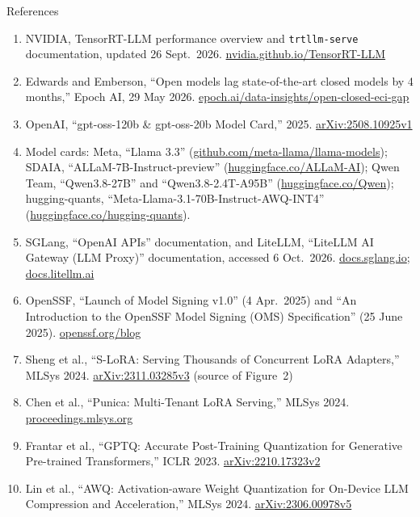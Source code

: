 \begin{frame}[allowframebreaks]{References}
\begin{enumerate}
    \item NVIDIA, TensorRT-LLM performance overview and \texttt{trtllm-serve} documentation, updated 26 Sept.\ 2026. \href{https://nvidia.github.io/TensorRT-LLM/developer-guide/perf-overview.html}{nvidia.github.io/TensorRT-LLM}
    \item Edwards and Emberson, ``Open models lag state-of-the-art closed models by 4 months,'' Epoch AI, 29 May 2026. \href{https://epoch.ai/data-insights/open-closed-eci-gap}{epoch.ai/data-insights/open-closed-eci-gap}
    \item OpenAI, ``gpt-oss-120b \& gpt-oss-20b Model Card,'' 2025. \href{https://arxiv.org/abs/2508.10925v1}{arXiv:2508.10925v1}
    \item Model cards: Meta, ``Llama 3.3'' (\href{https://github.com/meta-llama/llama-models/blob/main/models/llama3_3/MODEL_CARD.md}{github.com/meta-llama/llama-models}); SDAIA, ``ALLaM-7B-Instruct-preview'' (\href{https://huggingface.co/ALLaM-AI/ALLaM-7B-Instruct-preview}{huggingface.co/ALLaM-AI}); Qwen Team, ``Qwen3.8-27B'' and ``Qwen3.8-2.4T-A95B'' (\href{https://huggingface.co/Qwen/Qwen3.8-27B}{huggingface.co/Qwen}); hugging-quants, ``Meta-Llama-3.1-70B-Instruct-AWQ-INT4'' (\href{https://huggingface.co/hugging-quants/Meta-Llama-3.1-70B-Instruct-AWQ-INT4}{huggingface.co/hugging-quants}).
    \item SGLang, ``OpenAI APIs'' documentation, and LiteLLM, ``LiteLLM AI Gateway (LLM Proxy)'' documentation, accessed 6 Oct.\ 2026. \href{https://docs.sglang.io/basic_usage/openai_api_completions.html}{docs.sglang.io}; \href{https://docs.litellm.ai/docs/simple_proxy}{docs.litellm.ai}
    \item OpenSSF, ``Launch of Model Signing v1.0'' (4 Apr.\ 2025) and ``An Introduction to the OpenSSF Model Signing (OMS) Specification'' (25 June 2025). \href{https://openssf.org/blog/2025/04/04/launch-of-model-signing-v1-0-openssf-ai-ml-working-group-secures-the-machine-learning-supply-chain/}{openssf.org/blog}
    \item Sheng et al., ``S-LoRA: Serving Thousands of Concurrent LoRA Adapters,'' MLSys 2024. \href{https://arxiv.org/abs/2311.03285v3}{arXiv:2311.03285v3} (source of Figure~2)
    \item Chen et al., ``Punica: Multi-Tenant LoRA Serving,'' MLSys 2024. \href{https://proceedings.mlsys.org/paper_files/paper/2024/hash/054de805fcceb78a201f5e9d53c85908-Abstract-Conference.html}{proceedings.mlsys.org}
    \item Frantar et al., ``GPTQ: Accurate Post-Training Quantization for Generative Pre-trained Transformers,'' ICLR 2023. \href{https://arxiv.org/abs/2210.17323v2}{arXiv:2210.17323v2}
    \item Lin et al., ``AWQ: Activation-aware Weight Quantization for On-Device LLM Compression and Acceleration,'' MLSys 2024. \href{https://arxiv.org/abs/2306.00978v5}{arXiv:2306.00978v5}
  \end{enumerate}
\end{frame}
